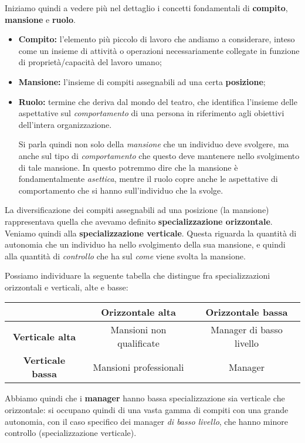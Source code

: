 \documentclass[a4paper,11pt]{article}
\begin{document}
Iniziamo quindi a vedere più nel dettaglio i concetti fondamentali di \textbf{compito}, \textbf{mansione} e \textbf{ruolo}.
\begin{itemize}
	\item \textbf{Compito:} l'elemento più piccolo di lavoro che andiamo a considerare, inteso come un insieme di attività o operazioni necessariamente collegate in funzione di proprietà/capacità del lavoro umano;
	\item \textbf{Mansione:} l'insieme di compiti assegnabili ad una certa \textbf{posizione};
	\item \textbf{Ruolo:} termine che deriva dal mondo del teatro, che identifica l'insieme delle aspettative sul \textit{comportamento} di una persona in riferimento agli obiettivi dell'intera organizzazione.

		Si parla quindi non solo della \textit{mansione} che un individuo deve svolgere, ma anche sul tipo di \textit{comportamento} che questo deve mantenere nello svolgimento di tale mansione.
		In questo potremmo dire che la mansione è fondamentalmente \textit{asettica}, mentre il ruolo copre anche le aspettative di comportamento che si hanno sull'individuo che la svolge.
\end{itemize}

La diversificazione dei compiti assegnabili ad una posizione (la mansione) rappresentava quella che avevamo definito \textbf{specializzazione orizzontale}.
Veniamo quindi alla \textbf{specializzazione verticale}.
Questa riguarda la quantità di autonomia che un individuo ha nello svolgimento della sua mansione, e quindi alla quantità di \textit{controllo} che ha sul \textit{come} viene svolta la mansione.

Possiamo individuare la seguente tabella che distingue fra specializzazioni orizzontali e verticali, alte e basse:
\begin{table}[h!]
	\center 
	\begin{tabular} { c | c c }
		& \bfseries Orizzontale alta & \bfseries Orizzontale bassa \\
		\hline
		\bfseries Verticale alta & Mansioni non qualificate & Manager di basso livello \\
		\bfseries Verticale bassa & Mansioni professionali & Manager \\
	\end{tabular}
\end{table}

Abbiamo quindi che i \textbf{manager} hanno bassa specializzazione sia verticale che orizzontale: si occupano quindi di una vasta gamma di compiti con una grande autonomia, con il caso specifico dei manager \textit{di basso livello}, che hanno minore controllo (specializzazione verticale).
\end{document}
